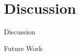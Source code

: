 \section{Discussion}
\begin{frame}{Discussion}
    
\end{frame}

\begin{frame}{Future Work}
    
\end{frame}
